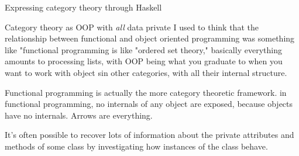 \documentclass[11pt, a4paper]{article}
\begin{document}
\begin{section}{Expressing category theory through Haskell}

\begin{subsection}{Category theory as OOP with {\em all} data private}
I used to think that the relationship between functional and object oriented programming was something like "functional programming is like "ordered set theory," basically everything amounts to processing lists, with OOP being what you graduate to when you want to work with object sin other categories, with all their internal structure.

Functional programming is actually the more category theoretic framework. in functional programming, no internals of any object are exposed, because objects have no internals. Arrows are everything.

It's often possible to recover lots of information about the private attributes and methods of some class by investigating how instances of the class behave.


\end{subsection}

\end{section}
\end{document}
